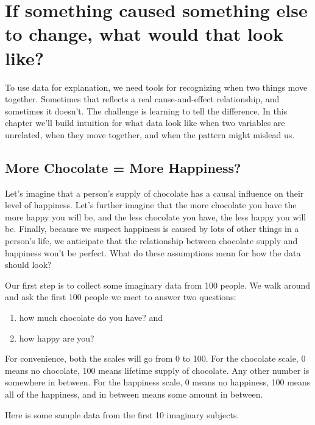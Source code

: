 \documentclass[
  letterpaper,
  DIV=11,
  numbers=noendperiod]{scrreprt}
\providecommand{\tightlist}{%
  \setlength{\itemsep}{0pt}\setlength{\parskip}{0pt}}
\begin{document}
\section{If something caused something else to change, what would that
look
like?}\label{if-something-caused-something-else-to-change-what-would-that-look-like}

To use data for explanation, we need tools for recognizing when two
things move together. Sometimes that reflects a real cause-and-effect
relationship, and sometimes it doesn't. The challenge is learning to
tell the difference. In this chapter we'll build intuition for what data
look like when two variables are unrelated, when they move together, and
when the pattern might mislead us.

\subsection{More Chocolate = More
Happiness?}\label{more-chocolate-more-happiness}

Let's imagine that a person's supply of chocolate has a causal influence
on their level of happiness. Let's further imagine that the more
chocolate you have the more happy you will be, and the less chocolate
you have, the less happy you will be. Finally, because we suspect
happiness is caused by lots of other things in a person's life, we
anticipate that the relationship between chocolate supply and happiness
won't be perfect. What do these assumptions mean for how the data should
look?

Our first step is to collect some imaginary data from 100 people. We
walk around and ask the first 100 people we meet to answer two
questions:

\begin{enumerate}
\def\labelenumi{\arabic{enumi}.}
\tightlist
\item
  how much chocolate do you have? and
\item
  how happy are you?
\end{enumerate}

For convenience, both the scales will go from 0 to 100. For the
chocolate scale, 0 means no chocolate, 100 means lifetime supply of
chocolate. Any other number is somewhere in between. For the happiness
scale, 0 means no happiness, 100 means all of the happiness, and in
between means some amount in between.

Here is some sample data from the first 10 imaginary subjects.
\end{document}
